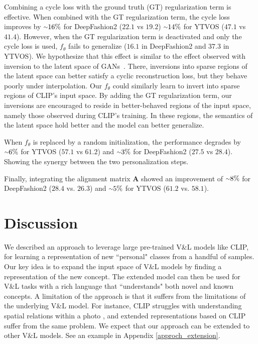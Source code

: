 \documentclass[runningheads]{llncs}
\newcommand{\tildeapprox}{{\raise.17ex\hbox{$\scriptstyle\sim$}}}
\renewcommand\vec[1]{\mathbf{#1}}
\newcommand{\ftheta}{f_\theta}
\newcommand{\A}{\vec{A}}
\newcommand{\VL}{V\&L {}}
\begin{document}
Combining a cycle loss with the ground truth (GT) regularization term is effective. When combined with the GT regularization term, the cycle loss improves by $\tildeapprox 16\%$ for DeepFashion2 ($22.1$ vs $19.2$)  $\tildeapprox 14\%$ for YTVOS ($47.1$ vs $41.4$). However, when the GT regularization term is deactivated and only the cycle loss is used, $\ftheta$ fails to generalize ($16.1$ in DeepFashion2 and $37.3$ in YTVOS).
We hypothesize that this effect is similar to the effect observed with inversion to the latent space of GANs~\cite{tov2021designing}.
There, inversions into sparse regions of the latent space can better satisfy a cyclic reconstruction loss, but they behave poorly under interpolation. Our $\ftheta$ could similarly learn to invert into sparse regions of CLIP's input space. By adding the GT regularization term, our inversions are encouraged to reside in better-behaved regions of the input space, namely those observed during CLIP's training. In these regions, the semantics of the latent space hold better and the model can better generalize. 


When $\ftheta$ is replaced by a random initialization, the performance degrades by $\tildeapprox 6\%$ for YTVOS ($57.1$ vs $61.2$) and $\tildeapprox 3\%$ for DeepFashion2 ($27.5$ vs $28.4$). Showing the synergy between the two personalization steps.

Finally, integrating the alignment matrix $\A$ showed an improvement of  $\tildeapprox 8\%$ for DeepFashion2 ($28.4$ vs. $26.3$) and $\tildeapprox 5\%$ for YTVOS ($61.2$ vs. $58.1$).





\section{Discussion}

We described an approach to leverage large pre-trained \VL models like CLIP, for learning a representation of new ``personal" classes from a handful of samples. Our key idea is to expand the input space of \VL models by finding a representation of the new concept. The extended model can then be used for \VL tasks with a rich language that ``understands" both novel and known concepts. A limitation of the approach is that it suffers from the limitations of the underlying \VL model. For instance, CLIP struggles with understanding spatial relations within a photo \cite{liu2021learning}, and extended representations based on CLIP suffer from the same problem. We expect that our approach can be extended to other \VL models. See an example in Appendix \ref{approch_extension}. 
\end{document}
